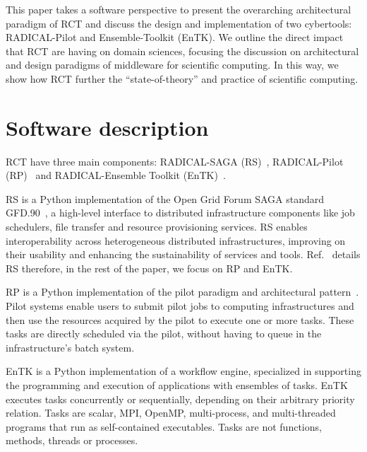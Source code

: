 \documentclass[preprint,12pt, a4paper]{elsarticle}
\begin{document}
This paper takes a software perspective to present the overarching
architectural paradigm of RCT and discuss the design and implementation of
two cybertools: RADICAL-Pilot and Ensemble-Toolkit (EnTK). We outline the
direct impact that RCT are having on domain sciences, focusing the discussion
on architectural and design paradigms of middleware for scientific computing.
In this way, we show how RCT further the ``state-of-theory'' and practice of
scientific computing.


\section{Software description}\label{sec:description}



RCT have three main components: RADICAL-SAGA (RS)~\cite{merzky2015saga},
RADICAL-Pilot (RP)~\cite{merzky2018using} and RADICAL-Ensemble Toolkit
(EnTK)~\cite{balasubramanian2016ensemble,balasubramanian2018harnessing}.

RS is a Python implementation of the Open Grid Forum SAGA standard
GFD.90~\cite{goodale2006saga}, a high-level interface to distributed
infrastructure components like job schedulers, file transfer and resource
provisioning services. RS enables interoperability across heterogeneous
distributed infrastructures, improving on their usability and enhancing the
sustainability of services and tools. Ref.~\cite{merzky2015saga} details RS
therefore, in the rest of the paper, we focus on RP and EnTK.

RP is a Python implementation of the pilot paradigm and architectural
pattern~\cite{turilli2018comprehensive}. Pilot systems enable users to submit
pilot jobs to computing infrastructures and then use the resources acquired
by the pilot to execute one or more tasks. These tasks are directly scheduled
via the pilot, without having to queue in the infrastructure's batch system.

EnTK is a Python implementation of a workflow engine, specialized in
supporting the programming and execution of applications with ensembles of
tasks. EnTK %
executes tasks concurrently or sequentially, depending on their arbitrary
priority relation. Tasks are scalar, MPI, OpenMP, multi-process, and
multi-threaded programs that run as self-contained executables. Tasks are not
functions, methods, threads or processes.
\end{document}
